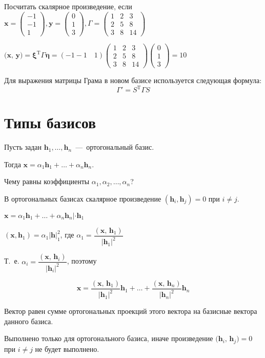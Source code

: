 \begin{prim}
Посчитать скалярное произведение, если
$\textbf{x}=\left(\begin{array}{r}
      -1 \\
      -1 \\
      1 
\end{array}\right), \textbf{y}=\left(\begin{array}{r}
      0\\
      1 \\
      3
\end{array}\right), \Gamma = \left(\begin{array}{ccc}
    1 & 2&3 \\
    2 &5&8 \\
    3&8&14
\end{array}\right)$
\end{prim}
$\textbf{(x, y)}=\bm \xi^\text{T}\Gamma\bm \eta=(-1-1\quad 1)\left(\begin{array}{ccc} %
    1 & 2&3 \\
    2 &5&8 \\
    3& 8 &14
\end{array}\right)\left(\begin{array}{r}
      0\\
      1 \\
      3
\end{array}\right)=10$

Для выражения матрицы Грама в новом базисе используется следующая формула:
$$\boxed{\Gamma'=S^\text{T}\Gamma S}$$
\section{Типы базисов}
Пусть задан $\textbf{h}_1,\dots, \textbf{h}_n$~---~ортогональный базис.

Тогда $\textbf{x}=\alpha_1 \textbf{h}_1+\dots+\alpha_n \textbf{h}_n$.

Чему равны коэффициенты $\alpha_1, \alpha_2,\dots, \alpha_n$?

В ортогональных базисах скалярное произведение $(\textbf{h}_i, \textbf{h}_j)=0$ при $i \neq j$.

$\textbf{x}=\alpha_1 \textbf{h}_1+\dots+\alpha_n \textbf{h}_n | \cdot \textbf{h}_1$

$(\textbf{x}, \textbf{h}_1)=\alpha_1 \textbf{|h|}_1^2$, где $\alpha_1 =\dfrac{(\textbf{x, h$_1$})}{|\textbf{h}_1|^2}$

Т.~е. $\alpha_i =\dfrac{(\textbf{x, h$_i$})}{|\textbf{h}_i|^2}$, поэтому

$$\textbf{x} = \dfrac{(\textbf{x, h$_1$})}{|\textbf{h}_1|^2} \textbf{h}_1 + \dots + \dfrac{(\textbf{x, h$_n$})}{|\textbf{h}_n|^2} \textbf{h}_n$$

Вектор равен сумме ортогональных проекций этого вектора на базисные вектора данного базиса.

Выполнено только для ортогонального базиса, иначе произведение $\textbf{(h$_i$, h$_j$)} = 0$ при $i \neq j$ не будет выполнено.


